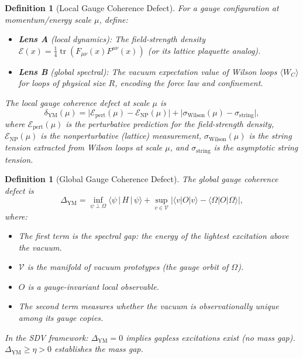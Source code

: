 \documentclass[11pt]{article}
\newtheorem{definition}[theorem]{Definition}
\DeclareMathOperator{\tr}{tr}
\begin{document}
\begin{definition}[Local Gauge Coherence Defect]
\label{def:local-defect}
For a gauge configuration at momentum/energy scale $\mu$, define:
\begin{itemize}
  \item \textbf{Lens A} (local dynamics): The field-strength density
    $\mathcal{E}(x) = \frac{1}{4}\tr(F_{\mu\nu}(x)F^{\mu\nu}(x))$
    (or its lattice plaquette analog).
  \item \textbf{Lens B} (global spectral): The vacuum expectation
    value of Wilson loops $\langle W_C \rangle$ for loops of physical
    size $R$, encoding the force law and confinement.
\end{itemize}
The \emph{local gauge coherence defect} at scale $\mu$ is
\begin{equation}\label{eq:local-defect}
  \delta_{\mathrm{YM}}(\mu) =
  \bigl|\mathcal{E}_{\mathrm{pert}}(\mu) -
  \mathcal{E}_{\mathrm{NP}}(\mu)\bigr|
  + \bigl|\sigma_{\mathrm{Wilson}}(\mu) - \sigma_{\mathrm{string}}\bigr|,
\end{equation}
where $\mathcal{E}_{\mathrm{pert}}(\mu)$ is the perturbative prediction
for the field-strength density, $\mathcal{E}_{\mathrm{NP}}(\mu)$ is
the nonperturbative (lattice) measurement,
$\sigma_{\mathrm{Wilson}}(\mu)$ is the string tension extracted from
Wilson loops at scale $\mu$, and $\sigma_{\mathrm{string}}$ is the
asymptotic string tension.
\end{definition}

\begin{definition}[Global Gauge Coherence Defect]
\label{def:global-defect}
The \emph{global gauge coherence defect} is
\begin{equation}\label{eq:global-defect}
  \Delta_{\mathrm{YM}} =
  \inf_{\psi \perp \Omega}
  \bigl\langle \psi \,\big|\, H \,\big|\, \psi \bigr\rangle
  + \sup_{v \in \mathcal{V}}
  \bigl|\langle v | O | v \rangle
  - \langle \Omega | O | \Omega \rangle\bigr|,
\end{equation}
where:
\begin{itemize}
  \item The first term is the spectral gap: the energy of the lightest
    excitation above the vacuum.
  \item $\mathcal{V}$ is the manifold of vacuum prototypes (the
    gauge orbit of $\Omega$).
  \item $O$ is a gauge-invariant local observable.
  \item The second term measures whether the vacuum is observationally
    unique among its gauge copies.
\end{itemize}
In the SDV framework: $\Delta_{\mathrm{YM}} = 0$ implies gapless
excitations exist (no mass gap).
$\Delta_{\mathrm{YM}} \geq \eta > 0$ establishes the mass gap.
\end{definition}
\end{document}
